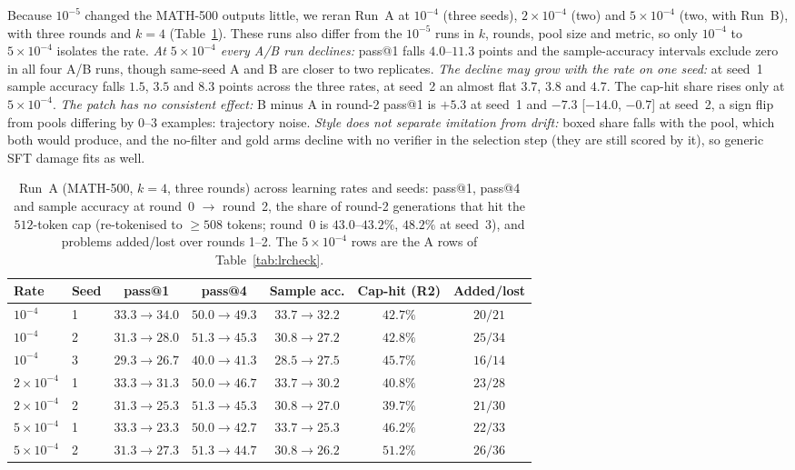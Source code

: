 \documentclass[runningheads]{llncs}
\begin{document}
Because $10^{-5}$ changed the MATH-500 outputs little, we reran Run~A at
$10^{-4}$ (three seeds), $2\times10^{-4}$ (two) and $5\times10^{-4}$ (two,
with Run~B), with three rounds and $k=4$ (Table~\ref{tab:lrseries}). These
runs also differ from the $10^{-5}$ runs in $k$, rounds, pool size and metric, so only $10^{-4}$ to $5\times10^{-4}$ isolates the rate.
\emph{At $5\times10^{-4}$ every A/B run declines:} pass@1 falls $4.0$--$11.3$
points and the sample-accuracy intervals exclude zero in all four A/B runs,
though same-seed A and B are closer to two replicates.
\emph{The decline may grow with the rate on one seed:} at seed~1 sample accuracy
falls $1.5$, $3.5$ and $8.3$ points across the three rates, at seed~2 an almost
flat $3.7$, $3.8$ and $4.7$. The cap-hit share rises only at $5\times10^{-4}$.
\emph{The patch has no consistent effect:} B minus A in round-2 pass@1 is
$+5.3$ at seed~1 and $-7.3$ [$-14.0$, $-0.7$] at seed~2, a sign flip from pools
differing by $0$--$3$ examples: trajectory noise.
\emph{Style does not separate imitation from drift:} boxed share falls with the
pool, which both would produce, and the no-filter and gold arms decline with no verifier in the selection step (they are still scored by it), so generic SFT damage fits as well.

\begin{table}[!htb]
\caption{Run~A (MATH-500, $k=4$, three rounds) across learning
rates and seeds: pass@1, pass@4 and sample accuracy at
round~0 $\to$ round~2, the share of round-2 generations that hit the
$512$-token cap (re-tokenised to $\ge508$ tokens; round~0 is
$43.0$--$43.2\%$, $48.2\%$ at seed~3), and problems added/lost over
rounds 1--2. The $5\times10^{-4}$ rows are the A rows
of Table~\ref{tab:lrcheck}.}
\label{tab:lrseries}
\centering
\setlength{\tabcolsep}{3pt}
\begin{tabular}{llccccc}
\toprule
Rate & Seed & pass@1 & pass@4 & Sample acc. & Cap-hit (R2) & Added/lost \\
\midrule
$10^{-4}$ & 1 & $33.3\to34.0$ & $50.0\to49.3$ & $33.7\to32.2$ & $42.7\%$ & $20/21$ \\
$10^{-4}$ & 2 & $31.3\to28.0$ & $51.3\to45.3$ & $30.8\to27.2$ & $42.8\%$ & $25/34$ \\
$10^{-4}$ & 3 & $29.3\to26.7$ & $40.0\to41.3$ & $28.5\to27.5$ & $45.7\%$ & $16/14$ \\
$2\times10^{-4}$ & 1 & $33.3\to31.3$ & $50.0\to46.7$ & $33.7\to30.2$ & $40.8\%$ & $23/28$ \\
$2\times10^{-4}$ & 2 & $31.3\to25.3$ & $51.3\to45.3$ & $30.8\to27.0$ & $39.7\%$ & $21/30$ \\
$5\times10^{-4}$ & 1 & $33.3\to23.3$ & $50.0\to42.7$ & $33.7\to25.3$ & $46.2\%$ & $22/33$ \\
$5\times10^{-4}$ & 2 & $31.3\to27.3$ & $51.3\to44.7$ & $30.8\to26.2$ & $51.2\%$ & $26/36$ \\
\bottomrule
\end{tabular}
\end{table}
\end{document}
